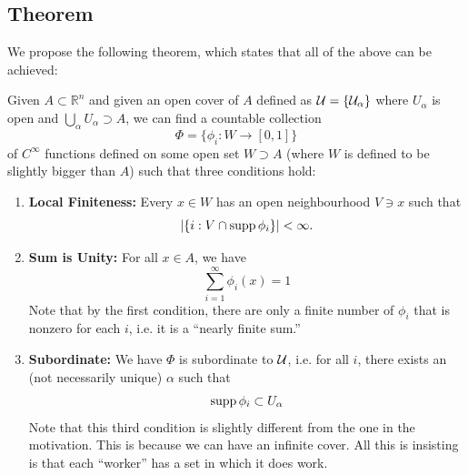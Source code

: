 \documentclass{article}
\begin{document}
\subsection{Theorem}
We propose the following theorem, which states that all of the above can be achieved:
\begin{theorem}
    Given $A\subset \mathbb{R}^n$ and given an open cover of $A$ defined as $\cal{U} = \{U_\alpha\}$ where $U_\alpha$ is open and $\bigcup_\alpha U_\alpha \supset A$, we can find a countable collection 
    \begin{equation}
        \Phi = \{\phi_i: W\rightarrow [0,1]\}
    \end{equation}
    of $C^\infty$ functions defined on some open set $W \supset A$ (where $W$ is defined to be slightly bigger than $A$) such that three conditions hold:
    \begin{enumerate}
        \item \textbf{Local Finiteness:} Every $x\in W$ has an open neighbourhood $V\ni x$ such that 
        \begin{equation}
            \left|\{i: V\cap \operatorname{supp} \phi_i \} \right| < \infty.
        \end{equation}
        \item \textbf{Sum is Unity:} For all $x\in A$, we have
        \begin{equation}
            \sum_{i=1}^\infty \phi_i(x) = 1
        \end{equation}
        Note that by the first condition, there are only a finite number of $\phi_i$ that is nonzero for each $i$, i.e. it is a ``nearly finite sum.''
        \item \textbf{Subordinate:} We have $\Phi$ is subordinate to $\cal{U}$, i.e. for all $i$, there exists an (not necessarily unique) $\alpha$ such that
        \begin{equation}
            \operatorname{supp} \phi_i \subset U_\alpha
        \end{equation}
        Note that this third condition is slightly different from the one in the motivation. This is because we can have an infinite cover. All this is insisting is that each ``worker'' has a set in which it does work.
    \end{enumerate}
\end{theorem}
\end{document}
